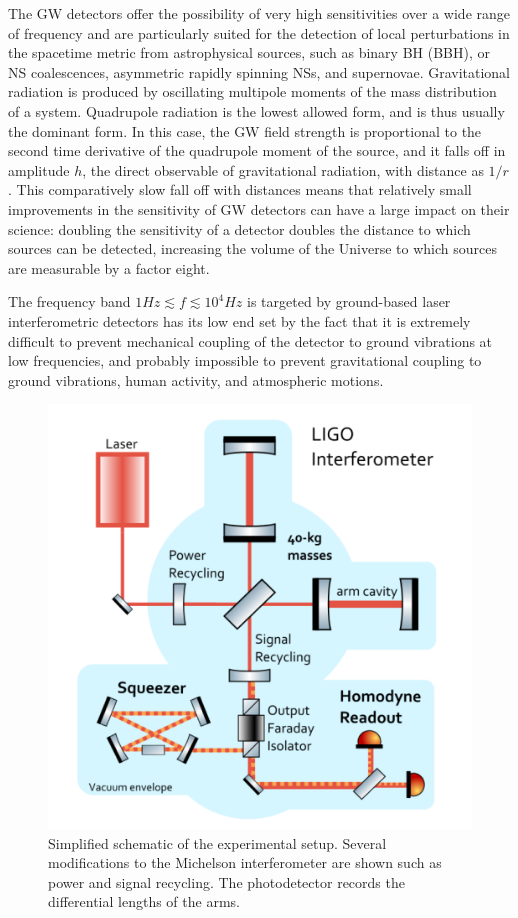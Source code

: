 \documentclass[binding=0.6cm, LaM]{sapthesis}
\begin{document}
	The GW detectors offer the possibility of very high sensitivities over a wide range of frequency and
        are particularly suited for the detection of local perturbations in the spacetime metric from astrophysical sources,
        such as binary BH (BBH), or NS coalescences, asymmetric rapidly spinning NSs,
        and supernovae.
 	Gravitational radiation is produced by oscillating multipole moments of the mass distribution of a system.
        Quadrupole radiation is the lowest allowed form, and is thus usually the dominant form.
        In this case, the GW field strength is proportional to the second time derivative of the quadrupole moment of the source,
        and it falls off in amplitude $h$, the direct observable of gravitational radiation, with distance as $1/r$.
        This comparatively slow fall off with distances means that relatively small improvements in the sensitivity
        of GW detectors can have a large impact on their science:
        doubling the sensitivity of a detector doubles the distance to which sources can be detected,
        increasing the volume of the Universe to which sources are measurable by a factor eight.

	The frequency band $1Hz \apprle f \apprle 10^4 Hz$ is targeted by
        ground-based laser interferometric detectors has its low end set by the fact that it is extremely difficult
        to prevent mechanical coupling of the detector to ground vibrations at low frequencies,
        and probably impossible to prevent gravitational coupling to ground vibrations, human activity, and atmospheric motions.
        \begin{figure}[t]
          \includegraphics[scale=0.5]{interferometer}
          \centering
          \caption{Simplified schematic of the experimental setup. Several modifications to the Michelson interferometer are shown such as power and signal recycling. The photodetector records the differential lengths of the arms. \cite{9}}
          \label{fig:interferometer}
        \end{figure}
\end{document}
